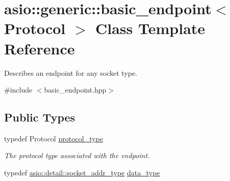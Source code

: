 \hypertarget{classasio_1_1generic_1_1basic__endpoint}{}\section{asio\+:\+:generic\+:\+:basic\+\_\+endpoint$<$ Protocol $>$ Class Template Reference}
\label{classasio_1_1generic_1_1basic__endpoint}


Describes an endpoint for any socket type.  




{\ttfamily \#include $<$basic\+\_\+endpoint.\+hpp$>$}

\subsection*{Public Types}
\begin{DoxyCompactItemize}
\item 
typedef Protocol \hyperlink{classasio_1_1generic_1_1basic__endpoint_adbb1d24211763cf405138afcc29330da}{protocol\+\_\+type}
\begin{DoxyCompactList}\small\item\em The protocol type associated with the endpoint. \end{DoxyCompactList}\item 
typedef \hyperlink{namespaceasio_1_1detail_a40a7b0385a38f87815ffbb8df5e34d05}{asio\+::detail\+::socket\+\_\+addr\+\_\+type} \hyperlink{classasio_1_1generic_1_1basic__endpoint_af8fe7c173ad82680b104c83000eab645}{data\+\_\+type}
\end{DoxyCompactItemize}
